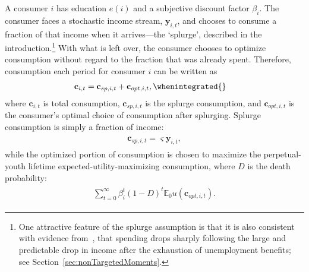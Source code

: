 \documentclass[\latexroot/\projectname]{subfiles}
\renewenvironment{verbatimwrite}[1]{\comment}{\endcomment}
\begin{document}
A consumer $i$ has education $e(i)$ and a subjective discount factor $\beta_i$. The consumer faces a stochastic income stream, $\mathbf{y}_{i,t}$, and chooses to consume a fraction of that income when it arrives---the `splurge', described in the introduction.\footnote{One attractive feature of the splurge assumption is that it is also consistent with evidence from~\cite{ganongConsumer2019}, that spending drops sharply following the large and predictable drop in income after the exhaustion of unemployment benefits; see Section~\ref{sec:nonTargetedMoments}.} With what is left over, the consumer chooses to optimize consumption without regard to the fraction that was already spent. Therefore, consumption each period for consumer $i$ can be written as
\begin{verbatimwrite}{\EqDir/splurge}
  \begin{equation}
    \begin{gathered}
      \begin{aligned}
        \mathbf{c}_{i,t} & = \mathbf{c}_{sp,i,t} + \mathbf{c}_{opt,i,t}, \whenintegrated{\label{eq:model}} 
      \end{aligned}
    \end{gathered}
  \end{equation}
\end{verbatimwrite}
\whenintegrated{}\whenstandalone{}
{\noindent}where $\mathbf{c}_{i,t}$ is total consumption, $\mathbf{c}_{sp,i,t}$ is the splurge consumption, and $\mathbf{c}_{opt,i,t}$ is the consumer's optimal choice of consumption after splurging.
Splurge consumption is simply a fraction of income:
\begin{equation}
  \begin{gathered}
    \begin{aligned}
      \mathbf{c}_{sp,i,t} = \varsigma \mathbf{y}_{i,t},
    \end{aligned}
  \end{gathered}
\end{equation}
while the optimized portion of consumption is chosen to maximize the perpetual-youth lifetime expected-utility-maximizing consumption, where $D$ is the death probability:
\begin{equation}
  \begin{gathered}
    \begin{aligned}
      \sum_{t=0}^{\infty}\beta_i^t {(1-D)}^t \mathbb{E}_0 u(\mathbf{c}_{opt,i,t}).
    \end{aligned}
  \end{gathered}
\end{equation}
\end{document}
